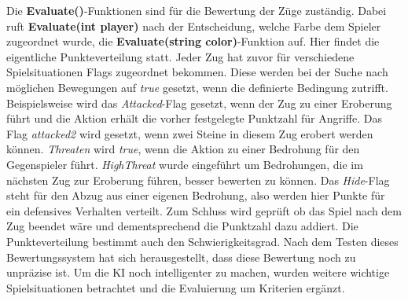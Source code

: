 Die \textbf{Evaluate()}-Funktionen sind für die Bewertung der Züge zuständig. Dabei ruft \textbf{Evaluate(int player)} nach der Entscheidung, welche Farbe dem Spieler zugeordnet wurde, die \textbf{Evaluate(string color)}-Funktion auf. Hier findet die eigentliche Punkteverteilung statt. Jeder Zug hat zuvor für verschiedene Spielsituationen Flags zugeordnet bekommen. Diese werden bei der Suche nach möglichen Bewegungen auf \textit{true} gesetzt, wenn die definierte Bedingung zutrifft. Beispielsweise wird das \textit{Attacked}-Flag gesetzt, wenn der Zug zu einer Eroberung führt und die Aktion erhält die vorher festgelegte Punktzahl für Angriffe. Das Flag \textit{attacked2} wird gesetzt, wenn zwei Steine in diesem Zug erobert werden können. \textit{Threaten} wird \textit{true}, wenn die Aktion zu einer Bedrohung für den Gegenspieler führt. \textit{HighThreat} wurde eingeführt um Bedrohungen, die im nächsten Zug zur Eroberung führen, besser bewerten zu können. Das \textit{Hide}-Flag steht für den Abzug aus einer eigenen Bedrohung, also werden hier Punkte für ein defensives Verhalten verteilt. Zum Schluss wird geprüft ob das Spiel nach dem Zug beendet wäre und dementsprechend die Punktzahl dazu addiert. Die Punkteverteilung bestimmt auch den Schwierigkeitsgrad. Nach dem Testen dieses Bewertungssystem hat sich herausgestellt, dass diese Bewertung noch zu unpräzise ist. Um die KI noch intelligenter zu machen, wurden weitere wichtige Spielsituationen betrachtet und die Evaluierung um Kriterien ergänzt.
